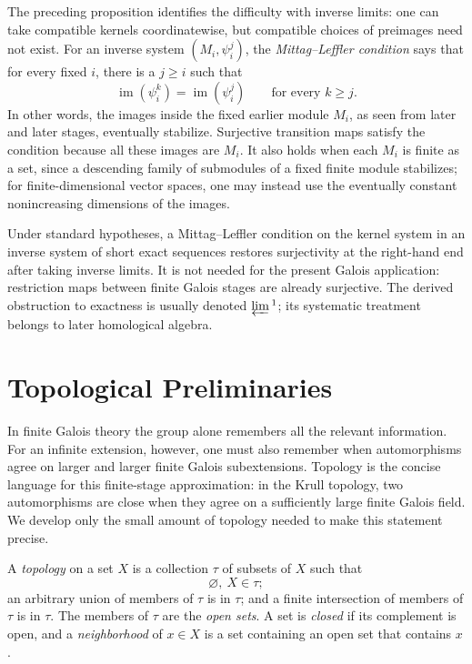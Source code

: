 \begin{remark}
The preceding proposition identifies the difficulty with inverse limits: one
can take compatible kernels coordinatewise, but compatible choices of
preimages need not exist.  For an inverse system \((M_i,\psi_i^j)\), the
\emph{Mittag--Leffler condition} says that for every fixed \(i\), there is a
\(j\geq i\) such that
\[
\operatorname{im}(\psi_i^k)=\operatorname{im}(\psi_i^j)
\qquad\text{for every }k\geq j.
\]
In other words, the images inside the fixed earlier module \(M_i\), as seen
from later and later stages, eventually stabilize.  Surjective transition
maps satisfy the condition because all these images are \(M_i\).  It also
holds when each \(M_i\) is finite as a set, since a descending family of
submodules of a fixed finite module stabilizes; for finite-dimensional vector
spaces, one may instead use the eventually constant nonincreasing dimensions
of the images.

Under standard hypotheses, a Mittag--Leffler condition on the kernel system
in an inverse system of short exact sequences restores surjectivity at the
right-hand end after taking inverse limits.  It is not needed for the present
Galois application: restriction maps between finite Galois stages are already
surjective.  The derived obstruction to exactness is usually denoted
\(\varprojlim{}^{1}\); its systematic treatment belongs to later homological
algebra.
\end{remark}

\section{Topological Preliminaries}

In finite Galois theory the group alone remembers all the relevant
information.  For an infinite extension, however, one must also remember when
automorphisms agree on larger and larger finite Galois subextensions.  Topology
is the concise language for this finite-stage approximation: in the Krull
topology, two automorphisms are close when they agree on a sufficiently large
finite Galois field.  We develop only the small amount of topology needed to
make this statement precise.


\begin{definition}
A \emph{topology} on a set \(X\) is a collection \(\tau\) of subsets of \(X\)
such that
\[
\varnothing,\ X\in\tau;
\]
an arbitrary union of members of \(\tau\) is in \(\tau\); and a finite
intersection of members of \(\tau\) is in \(\tau\).  The members of \(\tau\)
are the \emph{open sets}.  A set is \emph{closed} if its complement is open,
and a \emph{neighborhood} of \(x\in X\) is a set containing an open set that
contains \(x\).
\end{definition}

